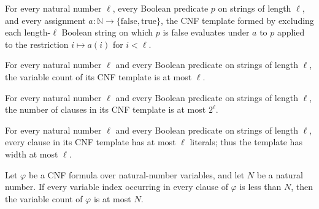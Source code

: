 \begin{theorem}
\label{Complexity.FormulaKit.template_eval}
\leanok
{}
For every natural number $\ell$, every Boolean predicate $p$ on strings of length
$\ell$, and every assignment $a:\mathbb{N}\to\{\mathrm{false},\mathrm{true}\}$, the CNF
template formed by excluding each length-$\ell$ Boolean string on which $p$ is false
evaluates under $a$ to $p$ applied to the restriction $i\mapsto a(i)$ for $i<\ell$.
\end{theorem}

\begin{theorem}
\label{Complexity.FormulaKit.template_numVars_le}
\leanok
{}
For every natural number $\ell$ and every Boolean predicate on strings of length $\ell$,
the variable count of its CNF template is at most $\ell$.
\end{theorem}

\begin{theorem}
\label{Complexity.FormulaKit.template_length_le}
\leanok
{}
For every natural number $\ell$ and every Boolean predicate on strings of length $\ell$,
the number of clauses in its CNF template is at most $2^\ell$.
\end{theorem}

\begin{theorem}
\label{Complexity.FormulaKit.template_widthAtMost}
\leanok
{}
For every natural number $\ell$ and every Boolean predicate on strings of length $\ell$,
every clause in its CNF template has at most $\ell$ literals; thus the template has
width at most $\ell$.
\end{theorem}

\begin{theorem}
\label{Complexity.FormulaKit.numVars_le_of_forall_lt}
\leanok
{}
Let $\varphi$ be a CNF formula over natural-number variables, and let $N$ be a natural
number. If every variable index occurring in every clause of $\varphi$ is less than $N$,
then the variable count of $\varphi$ is at most $N$.
\end{theorem}

